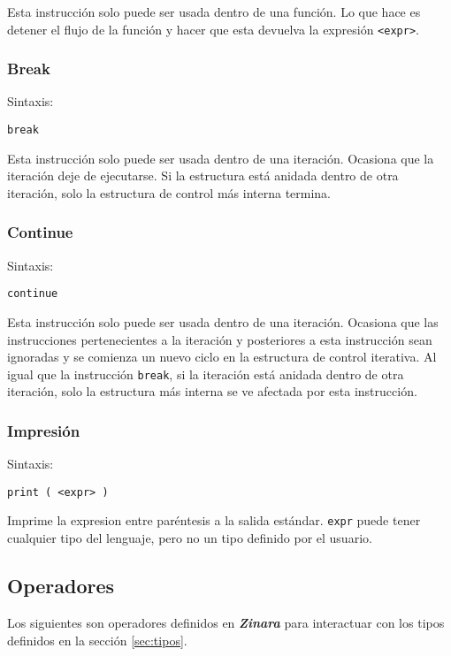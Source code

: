 \documentclass[12pt, spanish]{report}
\begin{document}
Esta instrucci\'on solo puede ser usada dentro de una funci\'on. Lo
que hace es detener el flujo de la funci\'on y hacer que esta devuelva
la expresi\'on \texttt{<expr>}.

\subsubsection{Break}
\label{sec:return}
Sintaxis:
\begin{verbatim}
break
\end{verbatim}

Esta instrucci\'on solo puede ser usada dentro de una
iteraci\'on. Ocasiona que la iteraci\'on deje de ejecutarse.
Si la estructura est\'a anidada dentro de otra iteraci\'on, 
solo la estructura de control m\'as interna termina.

\subsubsection{Continue}
\label{sec:return}
Sintaxis:
\begin{verbatim}
continue
\end{verbatim}

Esta instrucci\'on solo puede ser usada dentro de una
iteraci\'on. Ocasiona que las instrucciones pertenecientes a la
iteraci\'on y posteriores a esta instrucci\'on sean ignoradas y se
comienza un nuevo ciclo en la estructura de control iterativa.
Al igual que la instrucci\'on \texttt{break}, si la iteraci\'on est\'a
anidada dentro de otra iteraci\'on, solo la estructura m\'as interna se
ve afectada por esta instrucci\'on.

\subsubsection{Impresi\'on}
Sintaxis:
\begin{verbatim}
print ( <expr> )
\end{verbatim}

Imprime la expresion entre par\'entesis a la salida est\'andar. \texttt{expr}
puede tener cualquier tipo del lenguaje, pero no un tipo definido por el usuario.


\subsection{Operadores}
\label{sec:ops}

Los siguientes son operadores definidos en \emph{\textbf{Zinara}} para
interactuar con los tipos definidos en la secci\'on \ref{sec:tipos}.
\end{document}
